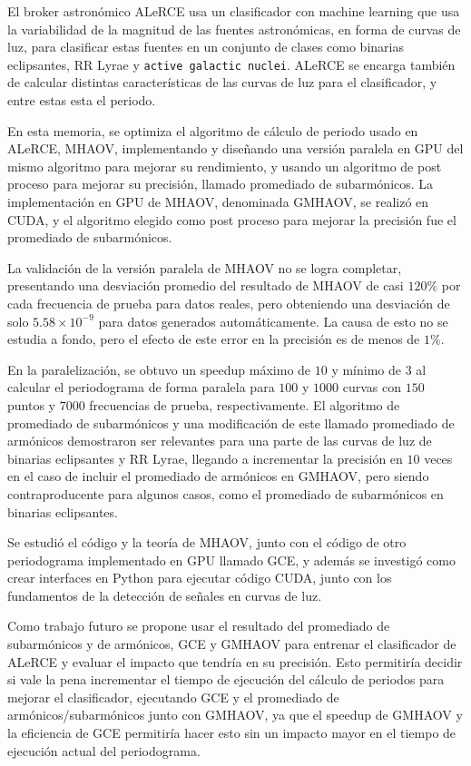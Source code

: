 
El broker astronómico ALeRCE usa un clasificador con machine learning que usa la variabilidad de la magnitud de las fuentes astronómicas, en forma de curvas de luz, para clasificar estas fuentes en un conjunto de clases como binarias eclipsantes, RR Lyrae y \texttt{active galactic nuclei}. ALeRCE se encarga también de calcular distintas características de las curvas de luz para el clasificador, y entre estas esta el periodo.

En esta memoria, se optimiza el algoritmo de cálculo de periodo usado en ALeRCE, MHAOV, implementando y diseñando una versión paralela en GPU del mismo algoritmo para mejorar su rendimiento, y usando un algoritmo de post proceso para mejorar su precisión, llamado promediado de subarmónicos. La implementación en GPU de MHAOV, denominada GMHAOV, se realizó en CUDA, y el algoritmo elegido como post proceso para mejorar la precisión fue el promediado de subarmónicos.

La validación de la versión paralela de MHAOV no se logra completar, presentando una desviación promedio del resultado de MHAOV de casi $120\%$ por cada frecuencia de prueba para datos reales, pero obteniendo una desviación de solo $5.58 \times 10^{-9}$ para datos generados automáticamente. La causa de esto no se estudia a fondo, pero el efecto de este error en la precisión es de menos de $1\%$.

En la paralelización, se obtuvo un speedup máximo de $10$ y mínimo de $3$ al calcular el periodograma de forma paralela para $100$ y $1000$ curvas con $150$ puntos y $7000$ frecuencias de prueba, respectivamente. El algoritmo de promediado de subarmónicos y una modificación de este llamado promediado de armónicos demostraron ser relevantes para una parte de las curvas de luz de binarias eclipsantes y RR Lyrae, llegando a incrementar la precisión en $10$ veces en el caso de incluir el promediado de armónicos en GMHAOV, pero siendo contraproducente para algunos casos, como el promediado de subarmónicos en binarias eclipsantes.

Se estudió el código y la teoría de MHAOV, junto con el código de otro periodograma implementado en GPU llamado GCE, y además se investigó como crear interfaces en Python para ejecutar código CUDA, junto con los fundamentos de la detección de señales en curvas de luz.

Como trabajo futuro se propone usar el resultado del promediado de subarmónicos y de armónicos, GCE y GMHAOV para entrenar el clasificador de ALeRCE y evaluar el impacto que tendría en su precisión. Esto permitiría decidir si vale la pena incrementar el tiempo de ejecución del cálculo de periodos para mejorar el clasificador, ejecutando GCE y el promediado de armónicos/subarmónicos junto con GMHAOV, ya que el speedup de GMHAOV y la eficiencia de GCE permitiría hacer esto sin un impacto mayor en el tiempo de ejecución actual del periodograma.




